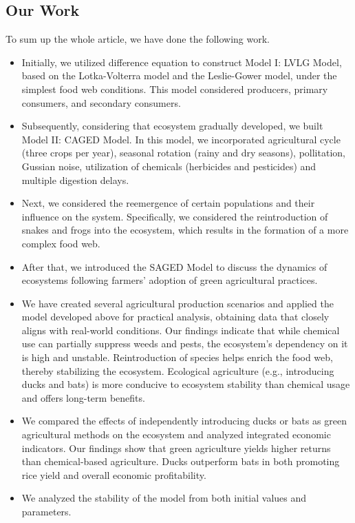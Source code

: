 \documentclass{HZNUMCM}
\begin{document}
    \subsection{Our Work}
      To sum up the whole article, we have done the following work.
    \begin{itemize}
      \item Initially, we utilized difference equation to construct Model I: 
      LVLG Model, based on the Lotka-Volterra model and the Leslie-Gower model, 
      under the simplest food web conditions. This model considered producers, primary consumers, and secondary consumers.
      \item Subsequently, considering that ecosystem gradually developed, we built Model II: CAGED Model. 
      In this model, we incorporated agricultural cycle (three crops per year), 
      seasonal rotation (rainy and dry seasons), pollitation, Gussian noise, utilization of chemicals (herbicides and pesticides) and multiple digestion delays. 
      \item Next, we considered the reemergence of certain populations and their influence on the system. Specifically, we considered the reintroduction of snakes and frogs into the ecosystem, 
      which results in the formation of a more complex food web.
      \item After that, we introduced the SAGED Model to discuss the dynamics of ecosystems following farmers' adoption of green agricultural practices.
      \item We have created several agricultural production scenarios and applied the model developed above for practical analysis, 
      obtaining data that closely aligns with real-world conditions. 
      Our findings indicate that while chemical use can partially suppress weeds and pests, 
      the ecosystem's dependency on it is high and unstable. Reintroduction of species helps enrich the food web, 
      thereby stabilizing the ecosystem. 
      Ecological agriculture (e.g., introducing ducks and bats) is more conducive to ecosystem stability than chemical usage and offers long-term benefits. 
      \item We compared the effects of independently introducing ducks or bats as green agricultural methods on the ecosystem and analyzed integrated economic indicators. 
      Our findings show that green agriculture yields higher returns than chemical-based agriculture. 
      Ducks outperform bats in both promoting rice yield and overall economic profitability.
      \item We analyzed the stability of the model from both initial values and parameters. 

\end{itemize}
\end{document}
